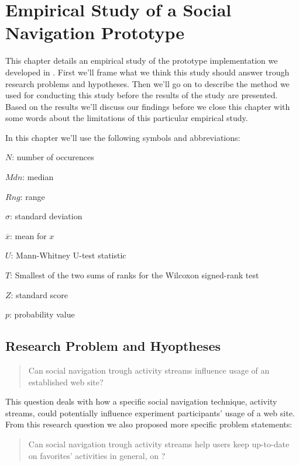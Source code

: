 \chapter{Empirical Study of a Social Navigation Prototype}
\label{chapter:empirical}

This chapter details an empirical study of the prototype implementation we
developed in . First we'll frame what we think this
study should answer trough research problems and hypotheses. Then we'll go on
to describe the method we used for conducting this study before the results of
the study are presented. Based on the results we'll discuss our findings
before we close this chapter with some words about the limitations of this
particular empirical study.

In this chapter we'll use the following symbols and abbreviations:

\begin{items}
  \item $N$: number of occurences
  \item $Mdn$: median
  \item $Rng$: range
  \item $\sigma$: standard deviation
  \item $\overline{x}$: mean for $x$
  \item $U$: Mann-Whitney U-test statistic
  \item $T$: Smallest of the two sums of ranks for
    the Wilcoxon signed-rank test
  \item $Z$: standard score
  \item $p$: probability value
\end{items}

\section{Research Problem and Hyoptheses}

\begin{quote}
  Can social navigation trough activity streams influence
  usage of an established web site?
\end{quote}

This question deals with how a specific social navigation technique, activity
streams, could potentially influence experiment participants' usage of a web
site.
From this research question we also proposed more specific problem statements:

\begin{quote}
  Can social navigation trough activity streams help users keep
  up-to-date on favorites' activities in general, on \urort{}?
\end{quote}

